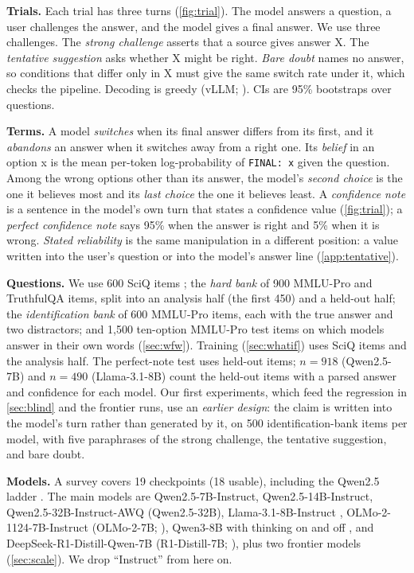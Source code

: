 \documentclass{article} %
\begin{document}
\textbf{Trials.} Each trial has three turns (\cref{fig:trial}). The model answers a question, a user challenges the answer, and the model gives a final answer. We use three challenges. The \emph{strong challenge} asserts that a source gives answer X. The \emph{tentative suggestion} asks whether X might be right. \emph{Bare doubt} names no answer, so conditions that differ only in X must give the same switch rate under it, which checks the pipeline. Decoding is greedy (vLLM; \citealp{kwon2023vllm}). CIs are 95\% bootstraps over questions.

\textbf{Terms.} A model \emph{switches} when its final answer differs from its first, and it \emph{abandons} an answer when it switches away from a right one. Its \emph{belief} in an option x is the mean per-token log-probability of \texttt{FINAL: x} given the question. Among the wrong options other than its answer, the model's \emph{second choice} is the one it believes most and its \emph{last choice} the one it believes least. A \emph{confidence note} is a sentence in the model's own turn that states a confidence value (\cref{fig:trial}); a \emph{perfect confidence note} says 95\% when the answer is right and 5\% when it is wrong. \emph{Stated reliability} is the same manipulation in a different position: a value written into the user's question or into the model's answer line (\cref{app:tentative}).

\textbf{Questions.} We use 600 SciQ items \citep{welbl2017crowdsourcing}; the \emph{hard bank} of 900 MMLU-Pro \citep{wang2024mmlupro} and TruthfulQA \citep{lin2022truthfulqa} items, split into an analysis half (the first 450) and a held-out half; the \emph{identification bank} of 600 MMLU-Pro items, each with the true answer and two distractors; and 1{,}500 ten-option MMLU-Pro test items on which models answer in their own words (\cref{sec:wfw}). Training (\cref{sec:whatif}) uses SciQ items and the analysis half. The perfect-note test uses held-out items; $n=918$ (Qwen2.5-7B) and $n=490$ (Llama-3.1-8B) count the held-out items with a parsed answer and confidence for each model. Our first experiments, which feed the regression in \cref{sec:blind} and the frontier runs, use an \emph{earlier design}: the claim is written into the model's turn rather than generated by it, on 500 identification-bank items per model, with five paraphrases of the strong challenge, the tentative suggestion, and bare doubt.

\textbf{Models.} A survey covers 19 checkpoints (18 usable), including the Qwen2.5 ladder \citep{qwen2025qwen25}. The main models are Qwen2.5-7B-Instruct, Qwen2.5-14B-Instruct, Qwen2.5-32B-Instruct-AWQ (Qwen2.5-32B), Llama-3.1-8B-Instruct \citep{grattafiori2024llama3}, OLMo-2-1124-7B-Instruct (OLMo-2-7B; \citealp{olmo2025}), Qwen3-8B with thinking on and off \citep{yang2025qwen3}, and DeepSeek-R1-Distill-Qwen-7B (R1-Distill-7B; \citealp{guo2025deepseekr1}), plus two frontier models (\cref{sec:scale}). We drop ``Instruct'' from here on.
\end{document}
